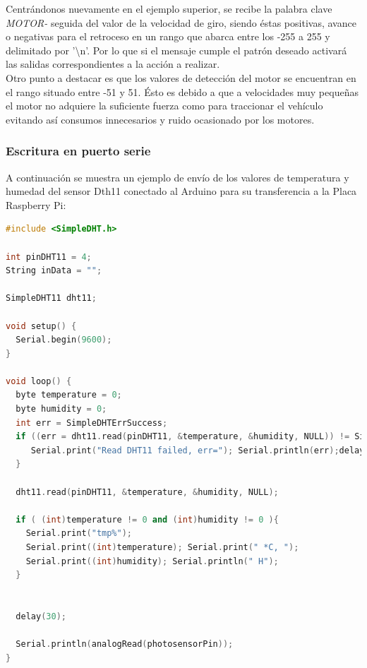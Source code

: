 Centrándonos nuevamente en el ejemplo superior, se recibe la palabra clave \emph{MOTOR-} seguida del valor de la velocidad de giro, siendo éstas positivas, avance o negativas para el retroceso en un rango
que abarca entre los -255 a 255 y delimitado por '\textbackslash n'. Por lo que si el mensaje cumple el patrón deseado activará las salidas correspondientes a la acción a realizar.\\

Otro punto a destacar es que los valores de detección del motor se encuentran en el rango situado entre -51 y 51. Ésto es debido a que a velocidades muy pequeñas el motor no adquiere la
suficiente fuerza como para traccionar el vehículo evitando así consumos innecesarios y ruido ocasionado por los motores.\\

\subsubsection{Escritura en puerto serie}

A continuación se muestra un ejemplo de envío de los valores de temperatura y humedad del sensor Dth11 conectado al Arduino para su transferencia a la Placa Raspberry Pi:\\

\begin{lstlisting}[language=C++]
#include <SimpleDHT.h>

int pinDHT11 = 4;
String inData = "";

SimpleDHT11 dht11;

void setup() {
  Serial.begin(9600);
}

void loop() {
  byte temperature = 0;
  byte humidity = 0;
  int err = SimpleDHTErrSuccess;
  if ((err = dht11.read(pinDHT11, &temperature, &humidity, NULL)) != SimpleDHTErrSuccess) {
     Serial.print("Read DHT11 failed, err="); Serial.println(err);delay(1000);
  }

  dht11.read(pinDHT11, &temperature, &humidity, NULL);

  if ( (int)temperature != 0 and (int)humidity != 0 ){
    Serial.print("tmp%");
    Serial.print((int)temperature); Serial.print(" *C, ");
    Serial.print((int)humidity); Serial.println(" H");
  }

  
  delay(30);

  Serial.println(analogRead(photosensorPin));
}

\end{lstlisting}

